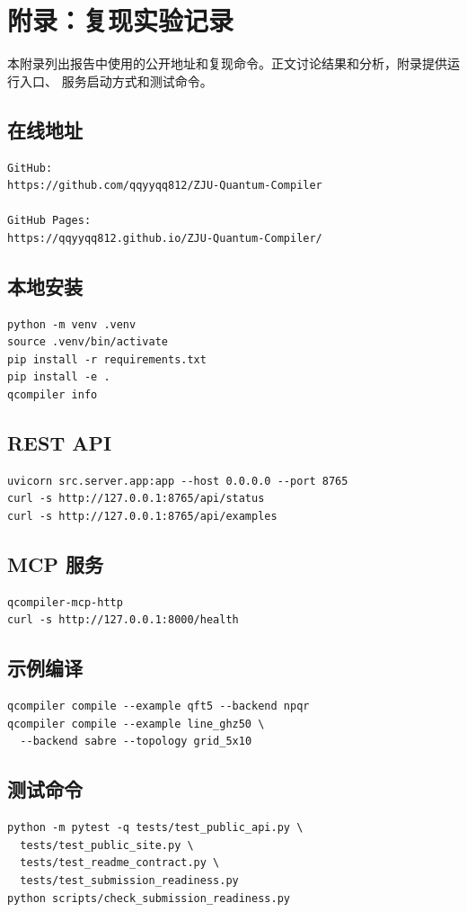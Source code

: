 \appendix
\section{附录：复现实验记录}

本附录列出报告中使用的公开地址和复现命令。正文讨论结果和分析，附录提供运行入口、
服务启动方式和测试命令。

\subsection{在线地址}

\begin{verbatim}
GitHub:
https://github.com/qqyyqq812/ZJU-Quantum-Compiler

GitHub Pages:
https://qqyyqq812.github.io/ZJU-Quantum-Compiler/
\end{verbatim}

\subsection{本地安装}

\begin{verbatim}
python -m venv .venv
source .venv/bin/activate
pip install -r requirements.txt
pip install -e .
qcompiler info
\end{verbatim}

\subsection{REST API}

\begin{verbatim}
uvicorn src.server.app:app --host 0.0.0.0 --port 8765
curl -s http://127.0.0.1:8765/api/status
curl -s http://127.0.0.1:8765/api/examples
\end{verbatim}

\subsection{MCP 服务}

\begin{verbatim}
qcompiler-mcp-http
curl -s http://127.0.0.1:8000/health
\end{verbatim}

\subsection{示例编译}

\begin{verbatim}
qcompiler compile --example qft5 --backend npqr
qcompiler compile --example line_ghz50 \
  --backend sabre --topology grid_5x10
\end{verbatim}

\subsection{测试命令}

\begin{verbatim}
python -m pytest -q tests/test_public_api.py \
  tests/test_public_site.py \
  tests/test_readme_contract.py \
  tests/test_submission_readiness.py
python scripts/check_submission_readiness.py
\end{verbatim}
